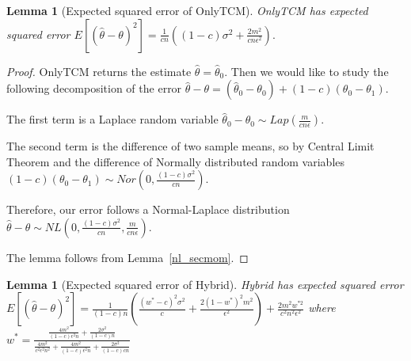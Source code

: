\documentclass{article}
\theoremstyle{plain}
\newtheorem{lem}[thm]{Lemma}
\begin{document}
\begin{lem}[Expected squared error of OnlyTCM]
\label{MSE_OnlyTCM}
OnlyTCM has expected squared error
$E[(\hat{\theta} - \theta)^2] = \frac{1}{cn}\left((1-c)\sigma^2 + \frac{2m^2}{cn \epsilon^2 }\right).$
\end{lem}
\begin{proof}
OnlyTCM returns the estimate $\hat{\theta} = \hat{\theta}_0$. Then we would like to study the following decomposition of the error
$\hat{\theta} - \theta = (\hat{\theta}_0 - \theta_0) + (1-c)(\theta_0 - \theta_1).$

The first term is a Laplace random variable
$\hat{\theta}_0 - \theta_0 \sim Lap\left(\frac{m}{cn\epsilon}\right).$

The second term is the difference of two sample means, so by Central Limit Theorem and the difference of Normally distributed random variables
$(1-c)(\theta_0 - \theta_1) \sim Nor\left(0, \frac{(1-c)\sigma^2}{cn}\right).$

Therefore, our error follows a Normal-Laplace distribution
$\hat{\theta} - \theta \sim NL\left(0, \frac{(1-c)\sigma^2}{cn}, \frac{m}{cn\epsilon} \right).$

The lemma follows from Lemma~\ref{nl_secmom}.
\end{proof}

\begin{lem}[Expected squared error of Hybrid]
Hybrid has expected squared error 
$E[(\hat{\theta} - \theta)^2] = \frac{1}{(1-c)n}\left(\frac{(w^*-c)^2\sigma^2}{c} + \frac{2(1-w^*)^2 m^2}{\epsilon^2}\right) + \frac{2m^2w^{*2}}{c^2n^2\epsilon^2}$
where
$w^* = \frac{\frac{4 m^2}{(1-c) \epsilon^2 n}+\frac{2 \sigma^2}{(1-c) n}}{\frac{4 m^2}{c^2 \epsilon^2 n^2}+\frac{4 m^2}{(1-c) \epsilon^2 n}+\frac{2 \sigma^2}{(1-c) c n}}$
\end{lem}
\end{document}
